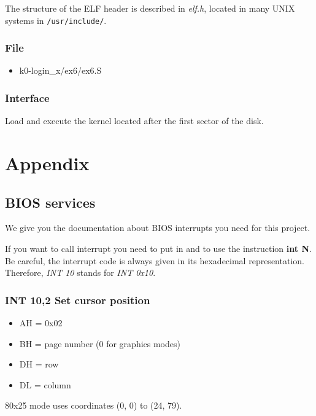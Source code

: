 The structure of the ELF header is described in \emph{elf.h}, located in many
UNIX systems in \verb+/usr/include/+.

\subsection*{File}
\begin{itemize}
  \item k0-login\_x/ex6/ex6.S
\end{itemize}

\subsection*{Interface}
{
  Load and execute the kernel located after the first sector of the disk.
}

%
%

\chapter{Appendix}

%
%

\section{BIOS services}

We give you the documentation about BIOS interrupts you need for this
project.

If you want to call interrupt  you need to put  in
 and to use the instruction \textbf{int N}. Be careful, the
interrupt code is always given in its hexadecimal representation. Therefore,
\emph{INT 10} stands for \emph{INT 0x10}.

%
%
\subsection{INT 10,2 Set cursor position}
\begin{itemize}
  \item
    AH = 0x02
  \item
    BH = page number (0 for graphics modes)
  \item
    DH = row
  \item
    DL = column
\end{itemize}

80x25 mode uses coordinates (0, 0) to (24, 79).

